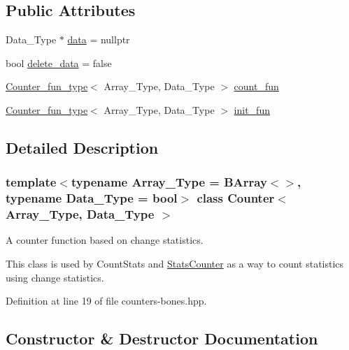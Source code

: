 \subsection*{Public Attributes}
\begin{DoxyCompactItemize}
\item 
Data\+\_\+\+Type $\ast$ \hyperlink{class_counter_a9ebfed99a67888f80c19cabc4098bdd0}{data} = nullptr
\item 
bool \hyperlink{class_counter_a5190fbe81aac2426ac36c0a088e242e7}{delete\+\_\+data} = false
\item 
\hyperlink{typedefs_8hpp_ac0160f52f564dea3ac033b374cffbfe7}{Counter\+\_\+fun\+\_\+type}$<$ Array\+\_\+\+Type, Data\+\_\+\+Type $>$ \hyperlink{class_counter_a804d287379ef9b4204a0838edcce3b71}{count\+\_\+fun}
\item 
\hyperlink{typedefs_8hpp_ac0160f52f564dea3ac033b374cffbfe7}{Counter\+\_\+fun\+\_\+type}$<$ Array\+\_\+\+Type, Data\+\_\+\+Type $>$ \hyperlink{class_counter_abb4e0b67e6489d438918495651baa5a8}{init\+\_\+fun}
\end{DoxyCompactItemize}


\subsection{Detailed Description}
\subsubsection*{template$<$typename Array\+\_\+\+Type = B\+Array$<$$>$, typename Data\+\_\+\+Type = bool$>$\newline
class Counter$<$ Array\+\_\+\+Type, Data\+\_\+\+Type $>$}

A counter function based on change statistics. 

This class is used by {\ttfamily Count\+Stats} and {\ttfamily \hyperlink{class_stats_counter}{Stats\+Counter}} as a way to count statistics using change statistics. 

Definition at line 19 of file counters-\/bones.\+hpp.



\subsection{Constructor \& Destructor Documentation}
\mbox{\label{class_counter_a56c2f4ad875497dea97934cd3ddebc81}} 
